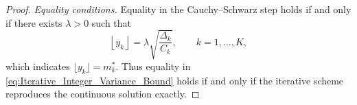 \begin{proof}
\medskip
\noindent
\textit{Equality conditions.}
Equality in the Cauchy--Schwarz step holds if and only if there exists
$\lambda>0$ such that
\[
\left\lfloor y_k \right\rfloor
=
\lambda \sqrt{\frac{\Delta_k}{C_k}},
\qquad k=1,\dots,K,
\]
which indicates $\lfloor y_k \rfloor= m_k^*$.  
Thus equality in \eqref{eq:Iterative_Integer_Variance_Bound} holds if and only if the iterative scheme reproduces the continuous solution exactly.






\end{proof}



